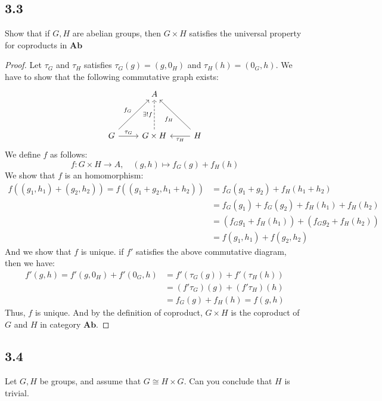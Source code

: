 \documentclass[a4paper, pdf, 12pt]{article}
\begin{document}
\subsection*{3.3} Show that if $G, H$ are abelian groups, then $G \times H$ satisfies the universal
property for coproducts in $\textbf{Ab}$
\begin{proof}
  Let $\tau_{G}$ and $\tau_{H}$ satisfies $\tau_{G}(g) = (g, 0_{H})$ and $\tau_{H}(h) = (0_{G}, h)$. We have to show that the following
  commutative graph exists:
  $$
    \begin{tikzcd}[row sep=huge]
      & A & \\
      G \ar[r, "\tau_{G}"] \ar[ur, "f_{G}"] & \ar[u, dashed, "\exists!f"] G\times H & \ar[ul, "f_{H}"] \ar[l, "\tau_{H}"] H
    \end{tikzcd}
  $$
  We define $f$ as follows:
  $$
    f: G\times H\rightarrow A, \quad (g,h)\mapsto f_G(g) + f_H(h)
  $$
  We show that $f$ is an homomorphism:
  $$
    \begin{aligned}
      f((g_1, h_1) + (g_2, h_2)) = f((g_1 + g_2, h_1 + h_2)) & = f_G(g_1+g_2) + f_H(h_1+h_2)                   \\
                                                             & = f_G(g_1) + f_G(g_2) + f_H(h_1) + f_H(h_2)     \\
                                                             & = (f_G{g_1}+f_{H}(h_1)) + (f_G{g_2} + f_H(h_2)) \\
                                                             & = f(g_1, h_1) + f(g_2, h_2)
    \end{aligned}
  $$
  And we show that $f$ is unique. if $f'$ satisfies the above commutative diagram, then we have:
  $$
    \begin{aligned}
      f'(g, h) = f'(g, 0_{H}) + f'(0_{G}, h) & = f'(\tau_{G}(g)) + f'(\tau_{H}(h)) \\
                                             & = (f'\tau_{G})(g) + (f'\tau_{H})(h) \\
                                             & = f_{G}(g) + f_{H}(h) = f(g,h)
    \end{aligned}
  $$ Thus, $f$ is unique. And by the definition of coproduct, $G\times H$ is the coproduct of $G$
  and $H$ in category $\textbf{Ab}$.

\end{proof}

\subsection*{3.4} Let $G, H$ be groups, and assume that $G \cong H \times G$. Can you conclude that $H$
is trivial.
\end{document}
